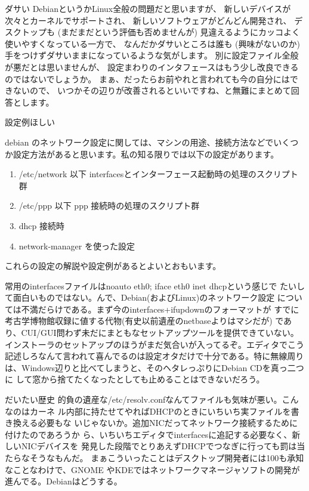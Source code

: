\documentclass[cjk,dvipdfmx]{beamer}
\begin{document}
\begin{frame}{ダサい}
DebianというかLinux全般の問題だと思いますが、
新しいデバイスが次々とカーネルでサポートされ、
新しいソフトウェアがどんどん開発され、
デスクトップも (まだまだという評価も否めませんが) 見違えるようにカッコよく使いやすくなっている一方で、
なんだかダサいところは誰も (興味がないのか) 手をつけずダサいままになっているような気がします。
別に設定ファイル全般が悪だとは思いませんが、
設定まわりのインタフェースはもう少し改良できるのではないでしょうか。
まぁ、だったらお前やれと言われても今の自分にはできないので、
いつかその辺りが改善されるといいですね、と無難にまとめて回答とします。
\end{frame}

\begin{frame}{設定例ほしい}

debian のネットワーク設定に関しては、マシンの用途、接続方法などでいくつ
か設定方法があると思います。私の知る限りでは以下の設定があります。


\begin{enumerate}
 \item /etc/network 以下
	interfacesとインターフェース起動時の処理のスクリプト群
 \item /etc/ppp 以下
	ppp 接続時の処理のスクリプト群
 \item dhcp 接続時
 \item network-manager を使った設定
\end{enumerate}

これらの設定の解説や設定例があるとよいとおもいます。
\end{frame}


\begin{frame}
常用のinterfacesファイルはnoauto eth0; iface eth0 inet dhcpという感じで
たいして面白いものではない。んで、Debian(およびLinux)のネットワーク設定
については不満だらけである。まず今のinterfaces+ifupdownのフォーマットが
すでに考古学博物館収録に値する代物(有史以前遺産のnetbaseよりはマシだが)
であり、CUI/GUI問わず未だにまともなセットアップツールを提供できていない。
インストーラのセットアップのほうがまだ気合いが入ってるぞ。エディタでこう
記述しろなんて言われて喜んでるのは設定オタだけで十分である。特に無線周り
は、Windows辺りと比べてしまうと、そのヘタレっぷりにDebian CDを真っ二つに
して窓から捨てたくなったとしても止めることはできないだろう。
\end{frame}

\begin{frame}
 だいたい歴史
 的負の遺産な/etc/resolv.confなんてファイルも気味が悪い。こんなのはカーネ
 ル内部に持たせてやればDHCPのときにいちいち実ファイルを書き換える必要もな
 いじゃないか。追加NICだってネットワーク接続するために付けたのであろうか
 ら、いちいちエディタでinterfacesに追記する必要なく、新しいNICデバイスを
 発見した段階でとりあえずDHCPでつなぎに行っても罰は当たらなそうなもんだ。
 まぁこういったことはデスクトップ開発者には100も承知なことなわけで、GNOME
 やKDEではネットワークマネージャソフトの開発が進んでる。Debianはどうする。
\end{frame}
\end{document}
